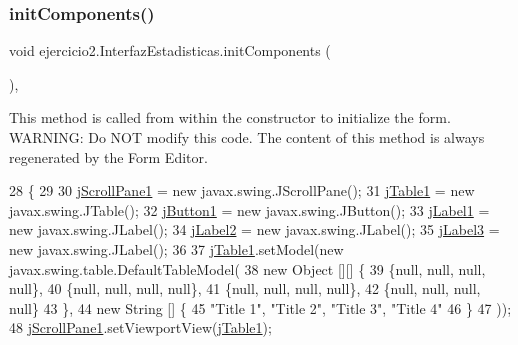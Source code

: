 \subsubsection{\texorpdfstring{init\+Components()}{initComponents()}}
{\footnotesize\ttfamily void ejercicio2.\+Interfaz\+Estadisticas.\+init\+Components (\begin{DoxyParamCaption}{ }\end{DoxyParamCaption})\hspace{0.3cm}{\ttfamily [inline]}, {\ttfamily [private]}}

This method is called from within the constructor to initialize the form. W\+A\+R\+N\+I\+NG\+: Do N\+OT modify this code. The content of this method is always regenerated by the Form Editor. 
\begin{DoxyCode}
28                                   \{
29 
30         \mbox{\hyperlink{classejercicio2_1_1_interfaz_estadisticas_a71c5280640fc8af4bc76d5e28c4ef3ba}{jScrollPane1}} = \textcolor{keyword}{new} javax.swing.JScrollPane();
31         \mbox{\hyperlink{classejercicio2_1_1_interfaz_estadisticas_a8e1c593e42b594f030777722609358a1}{jTable1}} = \textcolor{keyword}{new} javax.swing.JTable();
32         \mbox{\hyperlink{classejercicio2_1_1_interfaz_estadisticas_a2e04a5a0eb4f298d827c33c859436a97}{jButton1}} = \textcolor{keyword}{new} javax.swing.JButton();
33         \mbox{\hyperlink{classejercicio2_1_1_interfaz_estadisticas_a5e051aa4c804a5eb48e3f047abce704c}{jLabel1}} = \textcolor{keyword}{new} javax.swing.JLabel();
34         \mbox{\hyperlink{classejercicio2_1_1_interfaz_estadisticas_a227479001256e104ad41996508f6125e}{jLabel2}} = \textcolor{keyword}{new} javax.swing.JLabel();
35         \mbox{\hyperlink{classejercicio2_1_1_interfaz_estadisticas_a7cdf095cdfd4621585f0a166faab002e}{jLabel3}} = \textcolor{keyword}{new} javax.swing.JLabel();
36 
37         \mbox{\hyperlink{classejercicio2_1_1_interfaz_estadisticas_a8e1c593e42b594f030777722609358a1}{jTable1}}.setModel(\textcolor{keyword}{new} javax.swing.table.DefaultTableModel(
38             \textcolor{keyword}{new} Object [][] \{
39                 \{null, null, null, null\},
40                 \{null, null, null, null\},
41                 \{null, null, null, null\},
42                 \{null, null, null, null\}
43             \},
44             \textcolor{keyword}{new} String [] \{
45                 \textcolor{stringliteral}{"Title 1"}, \textcolor{stringliteral}{"Title 2"}, \textcolor{stringliteral}{"Title 3"}, \textcolor{stringliteral}{"Title 4"}
46             \}
47         ));
48         \mbox{\hyperlink{classejercicio2_1_1_interfaz_estadisticas_a71c5280640fc8af4bc76d5e28c4ef3ba}{jScrollPane1}}.setViewportView(\mbox{\hyperlink{classejercicio2_1_1_interfaz_estadisticas_a8e1c593e42b594f030777722609358a1}{jTable1}});

\end{DoxyCode}
